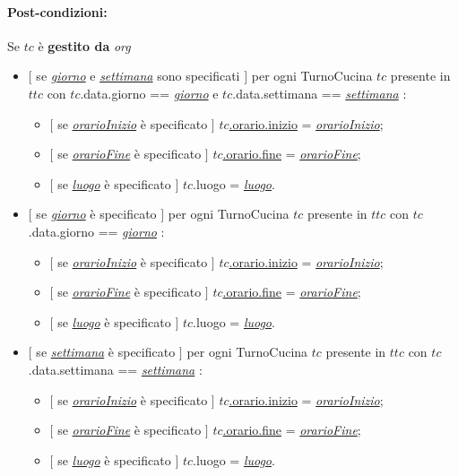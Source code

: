\paragraph{Post-condizioni:} Se $tc$ è \textbf{gestito da} {\textit{org}}
 \begin{itemize}
   \item $[$ se \underline{\textit{giorno}} e \underline{\textit{settimana}} sono specificati $]$ \textlangle per ogni TurnoCucina $tc$ presente in $ttc$ con $tc$.data.giorno == \underline{\textit{giorno}} e $tc$.data.settimana == \underline{\textit{settimana}} \textrangle:
\begin{itemize}
  \item $[$ se \underline{\textit{orarioInizio}} è specificato $]$ \underline{$tc$.orario.inizio} = \underline{\textit{orarioInizio}};
    \item $[$ se \underline{\textit{orarioFine}} è specificato $]$ \underline{$tc$.orario.fine} = \underline{\textit{orarioFine}};
  \item $[$ se \underline{\textit{luogo}} è specificato $]$ $tc$.luogo = \underline{\textit{luogo}}.
\end{itemize}
   \item $[$ se \underline{\textit{giorno}} è specificato $]$ \textlangle per ogni TurnoCucina $tc$ presente in $ttc$ con $tc$.data.giorno == \underline{\textit{giorno}} \textrangle:
\begin{itemize}
  \item $[$ se \underline{\textit{orarioInizio}} è specificato $]$ \underline{$tc$.orario.inizio} = \underline{\textit{orarioInizio}};
    \item $[$ se \underline{\textit{orarioFine}} è specificato $]$ \underline{$tc$.orario.fine} = \underline{\textit{orarioFine}};
  \item $[$ se \underline{\textit{luogo}} è specificato $]$ $tc$.luogo = \underline{\textit{luogo}}.
\end{itemize}
   \item $[$ se \underline{\textit{settimana}} è specificato $]$ \textlangle per ogni TurnoCucina $tc$ presente in $ttc$ con $tc$.data.settimana == \underline{\textit{settimana}} \textrangle:
\begin{itemize}
  \item $[$ se \underline{\textit{orarioInizio}} è specificato $]$ \underline{$tc$.orario.inizio} = \underline{\textit{orarioInizio}};
    \item $[$ se \underline{\textit{orarioFine}} è specificato $]$ \underline{$tc$.orario.fine} = \underline{\textit{orarioFine}};
  \item $[$ se \underline{\textit{luogo}} è specificato $]$ $tc$.luogo = \underline{\textit{luogo}}.
\end{itemize}

\end{itemize}

